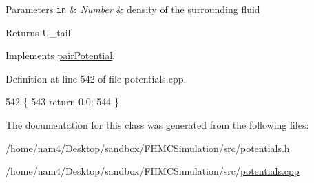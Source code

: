 \begin{DoxyParams}[1]{Parameters}
\mbox{\tt in}  & {\em Number} & density of the surrounding fluid\\
\hline
\end{DoxyParams}
\begin{DoxyReturn}{Returns}
U\-\_\-tail 
\end{DoxyReturn}


Implements \hyperlink{classpair_potential_a5387d21d8d487d1d42e9eaf7cae9175b}{pair\-Potential}.



Definition at line 542 of file potentials.\-cpp.


\begin{DoxyCode}
542                                                       \{
543     \textcolor{keywordflow}{return} 0.0;
544 \}
\end{DoxyCode}


The documentation for this class was generated from the following files\-:\begin{DoxyCompactItemize}
\item 
/home/nam4/\-Desktop/sandbox/\-F\-H\-M\-C\-Simulation/src/\hyperlink{potentials_8h}{potentials.\-h}\item 
/home/nam4/\-Desktop/sandbox/\-F\-H\-M\-C\-Simulation/src/\hyperlink{potentials_8cpp}{potentials.\-cpp}\end{DoxyCompactItemize}
